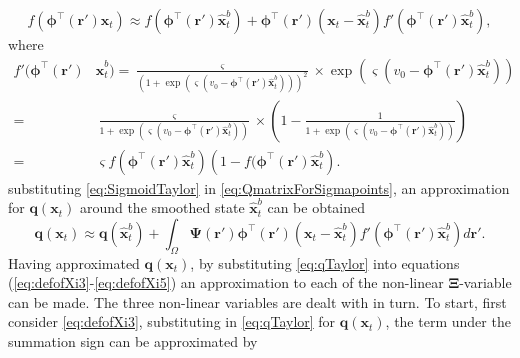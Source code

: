 \documentclass[]{article}
\begin{document}
\begin{equation}\label{eq:SigmoidTaylor}
 f\left(\boldsymbol \phi^\top\left(\mathbf r'\right)\mathbf x_t\right) \approx f\left(\boldsymbol \phi^\top(\mathbf r')\hat{\mathbf x}_t^b\right)+  \boldsymbol \phi^\top\left(\mathbf r'\right)\left(\mathbf x_t - \hat{\mathbf x}_t^b\right)f'\left(\boldsymbol \phi^\top\left(\mathbf r'\right)\hat{\mathbf x}_t^b\right),
\end{equation}
where 
 \begin{align}\label{eq:SigmoidDerivative}
  f'(\boldsymbol \phi^\top\left(\mathbf r'\right)&\hat{\mathbf x}_t^b)= \frac{\varsigma}{\left(1 + \exp \left( \varsigma \left( v_0 - \boldsymbol \phi^\top\left(\mathbf r'\right)\hat{\mathbf x}_t^b \right) \right)\right)^2} \times \exp \left( \varsigma \left( v_0 - \boldsymbol \phi^\top\left(\mathbf r'\right)\hat{\mathbf x}_t^b \right) \right) \nonumber \\
 =&\frac{\varsigma}{1 + \exp \left( \varsigma \left( v_0 - \boldsymbol \phi^\top\left(\mathbf r'\right)\hat{\mathbf x}_t^b \right) \right)} \times \left(1-\frac{1}{1 + \exp \left( \varsigma \left( v_0 - \boldsymbol \phi^\top\left(\mathbf r'\right)\hat{\mathbf x}_t^b \right) \right)}\right) \nonumber \\
 =& \varsigma f(\boldsymbol \phi^\top\left(\mathbf r'\right)\hat{\mathbf x}_t^b)\left( 1-f(\boldsymbol \phi^\top\left(\mathbf r'\right)\hat{\mathbf x}_t^b\right).
 \end{align}
substituting \eqref{eq:SigmoidTaylor} in \eqref{eq:QmatrixForSigmapoints},  an approximation for $\mathbf q(\mathbf x_t)$ around the smoothed state $\hat{\mathbf{x}}_t^b$ can be obtained
\begin{equation}\label{eq:qTaylor}
 \mathbf q(\mathbf x_t) \approx \mathbf q(\hat{\mathbf x}_t^b)+\int_\Omega \boldsymbol{\Psi}\left(\mathbf{r}'\right)\boldsymbol \phi^\top\left(\mathbf r'\right) \left(\mathbf x_t -\hat{\mathbf x}_t^b\right)f'\left(\boldsymbol \phi^\top\left(\mathbf r'\right)\hat{\mathbf x}_t^b\right) d\mathbf{r}'.
\end{equation}
Having approximated $\mathbf q\left(\mathbf x_t\right)$, by substituting  \eqref{eq:qTaylor} into equations (\ref{eq:defofXi3}-\ref{eq:defofXi5}) an approximation to each of the non-linear $\boldsymbol\Xi$-variable can be made. The three non-linear variables are dealt with in turn. To start, first consider \eqref{eq:defofXi3}, substituting in \eqref{eq:qTaylor} for $\mathbf q\left(\mathbf x_t\right)$, the term under the summation sign can be approximated by
\end{document}
